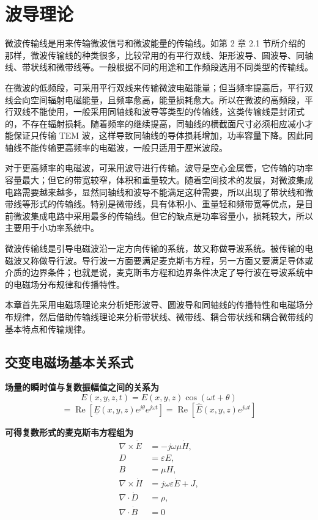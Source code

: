 \section{波导理论}

微波传输线是用来传输微波信号和微波能量的传输线。如第 2 章 2.1 节所介绍的那样，微波传输线的种类很多，比较常用的有平行双线、矩形波导、圆波导、同轴线、带状线和微带线等。一般根据不同的用途和工作频段选用不同类型的传输线。

在微波的低频段，可采用平行双线来传输微波电磁能量；但当频率提高后，平行双线会向空间辐射电磁能量，且频率愈高，能量损耗愈大。所以在微波的高频段，平行双线不能使用，一般采用同轴线和波导等类型的传输线，这类传输线是封闭式的，不存在辐射损耗。随着频率的继续提高，同轴线的横截面尺寸必须相应减小才能保证只传输 TEM 波，这样导致同轴线的导体损耗增加，功率容量下降。因此同轴线不能传输更高频率的电磁波，一般只适用于厘米波段。

对于更高频率的电磁波，可采用波导进行传输。波导是空心金属管，它传输的功率容量最大；但它的带宽较窄，体积和重量较大。随着空间技术的发展，对微波集成电路需要越来越多，显然同轴线和波导不能满足这种需要，所以出现了带状线和微带线等形式的传输线。特别是微带线，具有体积小、重量轻和频带宽等优点，是目前微波集成电路中采用最多的传输线。但它的缺点是功率容量小，损耗较大，所以主要用于小功率系统中。

微波传输线是引导电磁波沿一定方向传输的系统，故又称做导波系统。被传输的电磁波又称做导行波。导行波一方面要满足麦克斯韦方程，另一方面又要满足导体或介质的边界条件；也就是说，麦克斯韦方程和边界条件决定了导行波在导波系统中的电磁场分布规律和传播特性。

本章首先采用电磁场理论来分析矩形波导、圆波导和同轴线的传播特性和电磁场分布规律，然后借助传输线理论来分析带状线、微带线、耦合带状线和耦合微带线的基本特点和传输规律。



\subsection{交变电磁场基本关系式}

\textbf{场量的瞬时值与复数振幅值之间的关系为}
\[
E(x, y, z, t) = E(x, y, z) \cos(\omega t + \theta)
\]
\[
= \operatorname{Re}\left[\underline{E}(x, y, z) e^{j\theta} e^{j\omega t}\right] = \operatorname{Re}\left[\hat{E}(x, y, z) e^{j\omega t}\right]
\tag{3-1-1}
\]

\textbf{可得复数形式的麦克斯韦方程组为}
\[
\begin{aligned}
	\nabla \times \dot{E} &= -j \omega \mu \dot{H}, \\
	D &= \varepsilon E, \\
	B &= \mu H, \\
	\nabla \times \dot{H} &= j \omega \varepsilon \dot{E} + J, \\
	\nabla \cdot \dot{D} &= \rho, \\
	\nabla \cdot \dot{B} &= 0
\end{aligned}
\tag{3-1-2}
\]

